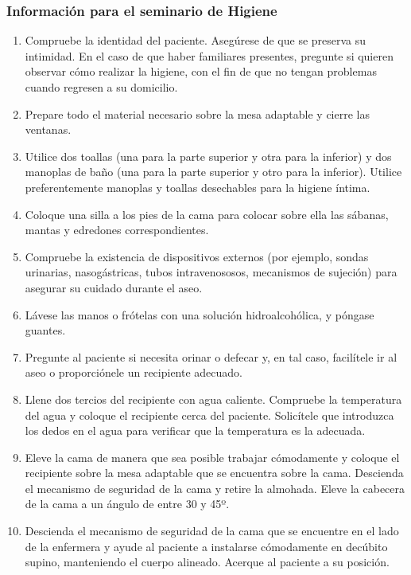 \subsubsection{Información para el seminario de Higiene}
\begin{enumerate}[topsep=0pt, partopsep=0pt,itemsep=0pt,parsep=0pt]
    \item Compruebe la identidad del paciente. Asegúrese de que se preserva su intimidad. En el caso de que haber familiares presentes, pregunte si quieren observar cómo realizar la higiene, con el fin de que no tengan problemas cuando regresen a su domicilio.
    \item Prepare todo el material necesario sobre la mesa adaptable y cierre las ventanas.
    \item Utilice dos toallas (una para la parte superior y otra para la inferior) y dos manoplas de baño (una para la parte superior y otro para la inferior). Utilice preferentemente manoplas y toallas desechables para la higiene íntima.
    \item Coloque una silla a los pies de la cama para colocar sobre ella las sábanas, mantas y edredones correspondientes.
    \item Compruebe la existencia de dispositivos externos (por ejemplo, sondas urinarias, nasogástricas, tubos intravenososos, mecanismos de sujeción) para asegurar su cuidado durante el aseo.
    \item Lávese las manos o frótelas con una solución hidroalcohólica, y póngase guantes.
    \item Pregunte al paciente si necesita orinar o defecar y, en tal caso, facilítele ir al aseo o proporciónele un recipiente adecuado.
    \item Llene dos tercios del recipiente con agua caliente. Compruebe la temperatura del agua y coloque el recipiente cerca del paciente. Solicítele que introduzca los dedos en el agua para verificar que la temperatura es la adecuada. 
    \item Eleve la cama de manera que sea posible trabajar cómodamente y coloque el recipiente sobre la mesa adaptable que se encuentra sobre la cama. Descienda el mecanismo de seguridad de la cama y retire la almohada. Eleve la cabecera de la cama a un ángulo de entre 30 y 45º.
    \item Descienda el mecanismo de seguridad de la cama que se encuentre en el lado de la enfermera y ayude al paciente a instalarse cómodamente en decúbito supino, manteniendo el cuerpo alineado. Acerque al paciente a su posición.

\end{enumerate}
